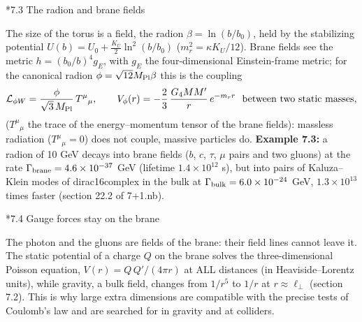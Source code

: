 \documentclass[10pt,a4paper]{article}
\makeatletter
\renewcommand\subsection{\@startsection{subsection}{2}{\z@}{-3.25ex\@plus -1ex \@minus -.2ex}{1.5ex \@plus .2ex}{\normalfont\large\bfseries\raggedright}}
\makeatother
\begin{document}
\subsection*{7.3 The radion and brane fields}
The size of the torus is a field, the radion $\beta=\ln(b/b_0)$, held by the stabilizing potential $U(b)=U_0+\frac{K_U}2\ln^2(b/b_0)$ ($m_r^2=\kappa K_U/12$). Brane fields see the metric $h=(b_0/b)^4g_E$, with $g_E$ the four-dimensional Einstein-frame metric; for the canonical radion $\phi=\sqrt{12}M_{\rm Pl}\beta$ this is the coupling
\begin{equation*}
\mathcal L_{\phi W}=\frac\phi{\sqrt3\,M_{\rm Pl}}\,T^\mu{}_\mu,\qquad V_\phi(r)=-\frac23\,\frac{G_4MM'}{r}\,e^{-m_rr}\ \ \text{between two static masses},
\end{equation*}
($T^\mu{}_\mu$ the trace of the energy–momentum tensor of the brane fields): massless radiation ($T^\mu{}_\mu=0$) does not couple, massive particles do. \textbf{Example 7.3:} a radion of 10 GeV decays into brane fields ($b$, $c$, $\tau$, $\mu$ pairs and two gluons) at the rate $\Gamma_{\rm brane}=4.6\times10^{-37}$ GeV (lifetime $1.4\times10^{12}$ s), but into pairs of Kaluza–Klein modes of dirac16complex in the bulk at $\Gamma_{\rm bulk}=6.0\times10^{-24}$ GeV, $1.3\times10^{13}$ times faster (section 22.2 of 7+1.nb).

\subsection*{7.4 Gauge forces stay on the brane}
The photon and the gluons are fields of the brane: their field lines cannot leave it. The static potential of a charge $Q$ on the brane solves the three-dimensional Poisson equation, $V(r)=Q\,Q'/(4\pi r)$ at ALL distances (in Heaviside–Lorentz units), while gravity, a bulk field, changes from $1/r^5$ to $1/r$ at $r\approx\ell_\perp$ (section 7.2). This is why large extra dimensions are compatible with the precise tests of Coulomb’s law and are searched for in gravity and at colliders.
\end{document}
